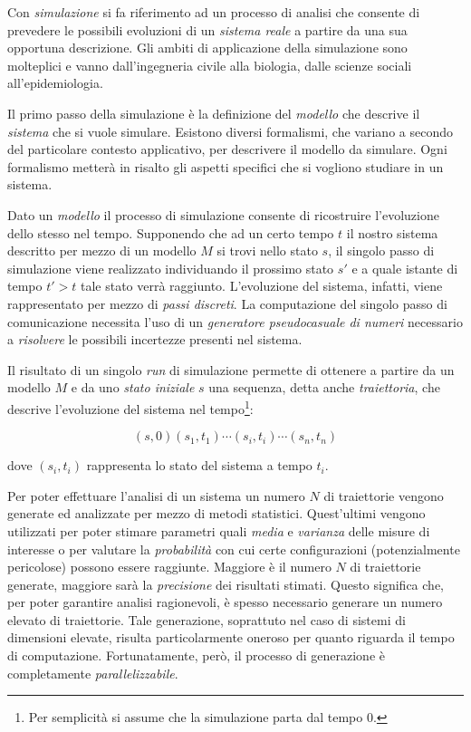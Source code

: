 
Con \emph{simulazione} si fa riferimento ad un processo di analisi che consente di prevedere le possibili evoluzioni di un \emph{sistema reale} a partire da una sua opportuna descrizione. 
%
Gli ambiti di applicazione della simulazione sono molteplici e vanno dall'ingegneria civile alla biologia, dalle scienze sociali all'epidemiologia.

Il primo passo della simulazione \`e la definizione del \emph{modello} che descrive il \emph{sistema} che si vuole simulare.
%
Esistono diversi formalismi, che variano a secondo del particolare contesto applicativo, per descrivere il modello da simulare.
%
Ogni formalismo metter\`a in risalto gli aspetti specifici che si vogliono studiare in un sistema. 

Dato un \emph{modello} il processo di simulazione consente di ricostruire l'evoluzione dello stesso nel tempo. 
%
Supponendo che ad un certo tempo $t$ il nostro sistema descritto per mezzo di un modello $M$ si trovi nello stato $s$, il singolo passo di simulazione viene realizzato individuando il prossimo stato $s'$ e a quale  istante di tempo $t'>t$ tale stato verr\`a raggiunto. 
%
L'evoluzione del sistema, infatti, viene rappresentato per mezzo di \emph{passi discreti}.
%
La computazione del singolo passo di comunicazione necessita l'uso di un \emph{generatore pseudocasuale di numeri} necessario a \emph{risolvere} le possibili incertezze presenti nel sistema.

Il risultato di un singolo \emph{run} di simulazione permette di ottenere a partire da un modello $M$ e da uno \emph{stato iniziale} $s$ una sequenza, detta anche \emph{traiettoria}, che descrive l'evoluzione del sistema nel tempo\footnote{Per semplicit\`a si assume che la simulazione parta dal tempo $0$.}:

\[
(s,0)(s_1,t_1)\cdots (s_i,t_i)\cdots (s_n,t_n)
\]  

\noindent
dove $(s_i,t_i)$ rappresenta lo stato del sistema a tempo $t_i$.

Per poter effettuare l'analisi di un sistema un numero $N$ di traiettorie vengono generate ed analizzate per mezzo di metodi statistici. Quest'ultimi vengono utilizzati per poter stimare parametri quali \emph{media} e \emph{varianza} delle misure di interesse o per valutare la \emph{probabilit\`a} con cui certe configurazioni (potenzialmente pericolose) possono essere raggiunte.
%
Maggiore \`e il numero $N$ di traiettorie generate, maggiore sar\`a la \emph{precisione} dei risultati stimati. 
%
Questo significa che, per poter garantire analisi ragionevoli, \`e spesso necessario generare un numero elevato di traiettorie.
%
Tale generazione, soprattuto nel caso di sistemi di dimensioni elevate, risulta particolarmente oneroso per quanto riguarda il tempo di computazione.
%
Fortunatamente, per\`o, il processo di generazione \`e completamente \emph{parallelizzabile}.

